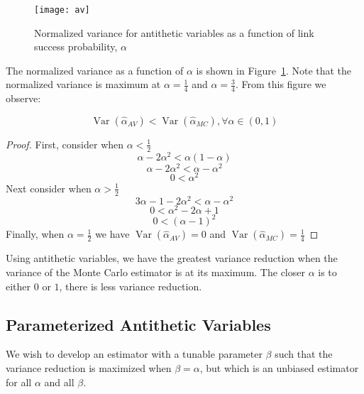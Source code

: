 \documentclass[11pt]{article}
\DeclareMathOperator{\var}{Var}
\begin{document}
\begin{figure}[ht!]
\centering
\texttt{[image: av]}
\caption{Normalized variance for antithetic variables as a function of link success probability, $\alpha$}\label{fig:av}
\end{figure}

The normalized variance as a function of $\alpha$ is shown in Figure~\ref{fig:av}. Note that the normalized variance is maximum at $\alpha = \frac{1}{4}$ and $\alpha = \frac{3}{4}$. From this figure we observe:
\begin{proposition}
\[
\var\left(\hat{\alpha}_{AV}\right) < \var\left(\hat{\alpha}_{MC}\right), \forall \alpha \in (0,1)
\]
\end{proposition}

\begin{proof}
First, consider when $\alpha < \frac{1}{2}$
\[
\alpha - 2\alpha^2  <  \alpha(1-\alpha)
\]
\[
\alpha - 2\alpha^2  <  \alpha-\alpha^2
\]
\[
0  <  \alpha^2
\]
Next consider when $\alpha > \frac{1}{2}$
\[
3\alpha - 1 - 2\alpha^2 < \alpha - \alpha^{2}
\]
\[
0 < \alpha^2 - 2\alpha + 1
\]
\[
0 < (\alpha - 1)^2
\]
Finally, when $\alpha = \frac{1}{2}$ we have $\var\left(\hat{\alpha}_{AV}\right) = 0$ and $\var\left(\hat{\alpha}_{MC}\right) = \frac{1}{4}$
\end{proof}
Using antithetic variables, we have the greatest variance reduction when the variance of the Monte Carlo estimator is at its maximum. The closer $\alpha$ is to either $0$ or $1$, there is less variance reduction.

\subsection{Parameterized Antithetic Variables}
We wish to develop an estimator with a tunable parameter $\beta$ such that the variance reduction is maximized when $\beta=\alpha$, but which is an unbiased estimator for all $\alpha$ and all $\beta$.
\end{document}
